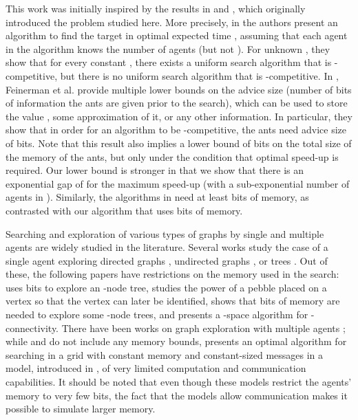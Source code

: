 \documentclass[11pt]{article}
\begin{document}
This work was initially inspired by the results in \cite{feinerman12disc} and \cite{feinerman12podc}, which originally introduced the problem studied here. More precisely, in \cite{feinerman12podc} the authors present an algorithm to find the target in optimal expected time , assuming that each agent in the algorithm knows the number  of agents (but not ). For unknown , they show that for every constant , there exists a uniform search algorithm that is -competitive, but there is no uniform search algorithm that is -competitive. In \cite{feinerman12disc}, Feinerman et al. provide multiple lower bounds on the advice size (number of bits of information the ants are given prior to the search), which can be used to store the value , some approximation of it, or any other information. In particular, they show that in order for an algorithm to be -competitive, the ants need advice size of  bits. Note that this result also implies a lower bound of  bits on the total size of the memory of the ants, but only under the condition that optimal speed-up is required. Our lower bound is stronger in that we show that there is an exponential gap of  for the maximum speed-up (with a sub-exponential number of agents in ). Similarly, the algorithms in \cite{feinerman12podc} need at least  bits of memory, as contrasted with our algorithm that uses  bits of memory. 

 Searching and exploration of various types of graphs by single and multiple agents are widely studied in the literature. Several works study the case of a single agent exploring directed graphs \cite{albers00, bender98, deng90}, undirected graphs \cite{panaite19, reingold05}, or trees \cite{diks02, gasieniec07}. Out of these, the following papers have restrictions on the memory used in the search: \cite{gasieniec07} uses  bits to explore an -node tree, \cite{bender98} studies the power of a pebble placed on a vertex so that the vertex can later be identified, \cite{diks02} shows that  bits of memory are needed to explore some -node trees, and \cite{reingold05} presents a -space algorithm for -connectivity. There have been works on graph exploration with multiple agents \cite{alon08, emek13, fraigniaud06}; while \cite{alon08} and \cite{fraigniaud06} do not include any memory bounds, \cite{emek13} presents an optimal algorithm for searching in a grid with constant memory and constant-sized messages in a model, introduced in \cite{emek13podc}, of very limited computation and communication capabilities. It should be noted that even though these models restrict the agents' memory to very few bits, the fact that the models allow communication makes it possible to simulate larger memory. 
 
\end{document}
